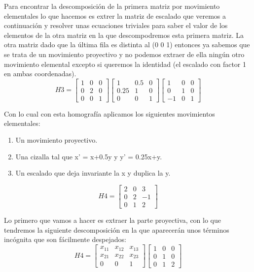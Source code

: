 \documentclass[10pt,a4paper]{article}
\begin{document}
Para encontrar la descomposición de la primera matriz por movimiento elementales lo que hacemos es extrer la matriz de escalado que veremos a continuación y resolver unas ecuaciones triviales para saber el valor de los elementos de la otra matriz en la que descompodremos esta primera matriz. La otra matriz dado que la última fila es distinta al (0 0 1) entonces ya sabemos que se trata de un movimiento proyectivo y no podemos extraer de ella ningún otro movimiento elemental excepto si queremos la identidad (el escalado con factor 1 en ambas coordenadas).\\

\[H3 = 
\begin{bmatrix}
1&0&0\\
0&2&0\\
0&0&1
\end{bmatrix}
\begin{bmatrix}
1&0.5&0\\
0.25&1&0\\
0&0&1
\end{bmatrix}
\begin{bmatrix}
1&0&0\\
0&1&0\\
-1&0&1
\end{bmatrix}
\]

Con lo cual con esta homografía aplicamos los siguientes movimientos elementales:\\

\begin{enumerate}
\item Un movimiento proyectivo.
\item Una cizalla tal que x' = x+0.5y y y' = 0.25x+y.
\item Un escalado que deja invariante la x y duplica la y.
\end{enumerate}

\[H4 = 
\begin{bmatrix}
2&0&3\\
0&2&-1\\
0&1&2
\end{bmatrix}
\]

Lo primero que vamos a hacer es extraer la parte proyectiva, con lo que tendremos la siguiente descomposición en la que aparecerán unos términos incógnita que son fácilmente despejados:\\

\[H4 = 
\begin{bmatrix}
x_{11}&x_{12}&x_{13}\\
x_{21}&x_{22}&x_{23}\\
0&0&1
\end{bmatrix}
\begin{bmatrix}
1&0&0\\
0&1&0\\
0&1&2
\end{bmatrix}
\]
\end{document}
